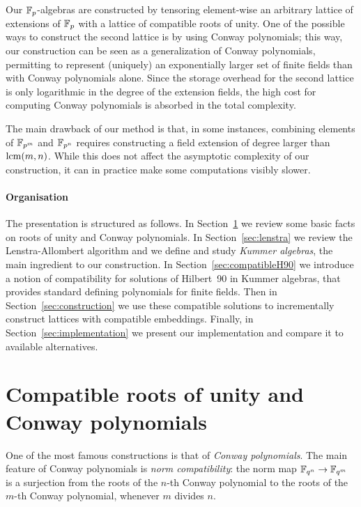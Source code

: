 \documentclass{sig-alternate}
\begin{document}
Our $\mathbb{F}_{p}$-algebras are constructed by tensoring element-wise an
arbitrary lattice of extensions of $\mathbb{F}_{p}$ with a lattice of compatible
roots of unity. %
One of the possible ways to construct the second lattice is by using
Conway polynomials; this way, our construction can be seen as a
generalization of Conway polynomials, permitting to represent
(uniquely) an exponentially larger set of finite fields than with
Conway polynomials alone. %
Since the storage overhead for the second lattice is only logarithmic
in the degree of the extension fields, the high cost for computing
Conway polynomials is absorbed in the total complexity.

The main drawback of our method is that, in some instances, combining
elements of $\mathbb{F}_{p^m}$ and $\mathbb{F}_{p^n}$ requires constructing a field
extension of degree larger than $\operatorname{lcm}(m,n)$. %
While this does not affect the asymptotic complexity of our
construction, %
it can in practice make some computations visibly slower.


\paragraph{Organisation}
The presentation is structured as follows. %
In Section~\ref{sec:conway} we review some basic facts on roots of
unity and Conway polynomials. %
In Section~\ref{sec:lenstra} we review the Lenstra-Allombert algorithm
and we define and study \emph{Kummer algebras},
the main ingredient to our construction. %
In Section~\ref{sec:compatibleH90} we introduce a notion of compatibility
for solutions of Hilbert~90 in Kummer algebras, that provides standard
defining polynomials for finite fields.
Then in Section~\ref{sec:construction} we use these compatible solutions
to incrementally construct lattices with compatible embeddings.
Finally, in Section~\ref{sec:implementation} we present our
implementation and compare it to available alternatives.


\section{Compatible roots of unity and Conway polynomials}
\label{sec:conway}


One of the most famous constructions is that of \emph{Conway
  polynomials}. %
The main feature of Conway polynomials is \emph{norm compatibility}:
the norm map $\mathbb{F}_{q^n}\to\mathbb{F}_{q^m}$ is a surjection from the roots of the
$n$-th Conway polynomial to the roots of the $m$-th Conway polynomial,
whenever $m$ divides $n$. %
\end{document}

